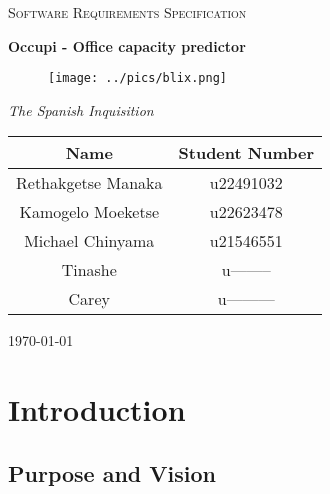 \documentclass[11pt,a4paper]{article}
\begin{document}
\begin{titlepage}
    \centering
    {\scshape\LARGE Software Requirements Specification\par}
    \vspace{1.5cm}
    {\huge\bfseries Occupi - Office capacity predictor\par}
    \begin{figure}[h]
        \centering %
        \texttt{[image: ../pics/blix.png]}
    \end{figure}
    \vspace{2.5cm}
    {\Large\itshape The Spanish Inquisition\par}
    \begin{tabular}{|c|c|}
        \hline
        \textbf{Name}      & \textbf{Student Number} \\
        \hline
        Rethakgetse Manaka & u22491032               \\
        Kamogelo Moeketse  & u22623478               \\
        Michael Chinyama   & u21546551               \\
        Tinashe            & u--------               \\
        Carey              & u---------              \\
        \hline
    \end{tabular}
    \vfill
    {\large \today\par}
\end{titlepage}

\tableofcontents
\pagebreak


\section*{Introduction}

\subsection*{Purpose and Vision}
\end{document}
